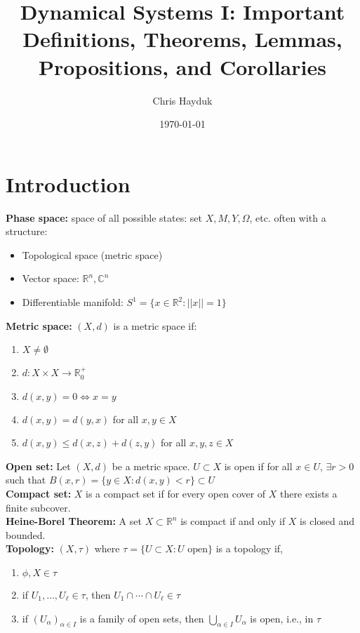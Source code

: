 \documentclass[12pt]{article}
\begin{document}
\title{Dynamical Systems I: Important Definitions, Theorems, Lemmas, Propositions, and Corollaries}

\author{Chris Hayduk}
\date{\today}

\maketitle

\section{Introduction}

\textbf{Phase space:} space of all possible states: set $X, M, Y, \Omega$, etc. often with a structure:
\begin{itemize}
\item Topological space (metric space)
\item Vector space: $\mathbb{R}^n, \mathbb{C}^n$
\item Differentiable manifold: $S^1 = \{x \in \mathbb{R}^2: ||x|| = 1 \}$
\end{itemize}

\textbf{Metric space:} $(X, d)$ is a metric space if:
\begin{enumerate}
\item $X \neq \emptyset$
\item $d: X \times X \to \mathbb{R}_0^+$
\item $d(x, y) = 0 \iff x = y$
\item $d(x, y) = d(y, x)$ for all $x, y \in X$
\item $d(x, y) \leq d(x, z) + d(z, y)$ for all $x, y, z \in X$
\end{enumerate}

\textbf{Open set:} Let $(X, d)$ be a metric space. $U \subset X$ is open if for all $x \in U$, $\exists r > 0$ such that $B(x, r) = \{y \in X: d(x, y) < r\} \subset U$\\

\textbf{Compact set:} $X$ is a compact set if for every open cover of $X$ there exists a finite subcover.\\

\textbf{Heine-Borel Theorem:} A set $X \subset \mathbb{R}^n$ is compact if and only if $X$ is closed and bounded.\\

\textbf{Topology:} $(X, \tau)$ where $\tau = \{U \subset X: U \text{ open}\}$ is a topology if,
\begin{enumerate}
\item $\phi, X \in \tau$
\item if $U_1, \ldots, U_{\ell} \in \tau$, then $U_1 \cap \cdots \cap U_{\ell} \in \tau$
\item if $(U_{\alpha})_{\alpha \in I}$ is a family of open sets, then $\bigcup_{\alpha \in I} U_{\alpha}$ is open, i.e., in $\tau$
\end{enumerate}
\end{document}
